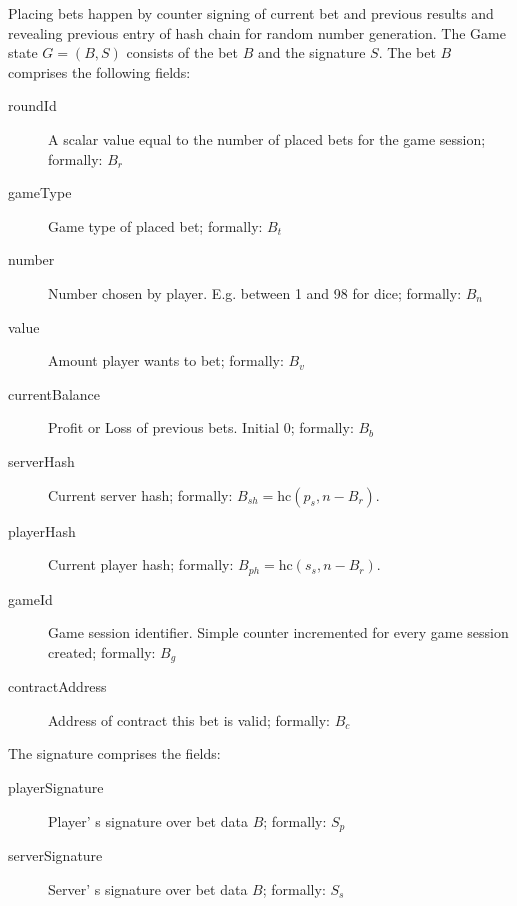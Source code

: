 \documentclass[oneside]{amsart}
\makeatletter
\newcommand*\Eg{E.g.\@\xspace}
\makeatother
\begin{document}
\begin{multicols}{2}
Placing bets happen by counter signing of current bet and previous results and revealing previous entry of
hash chain for random number generation.
The Game state $G = (B, S)$ consists of the bet $B$ and the signature $S$.
The bet $B$ comprises the following fields:
\begin{description}
    \item[roundId] A scalar value equal to the number of placed bets for the game session; formally: $B_r$
    \item[gameType] Game type of placed bet; formally: $B_t$
    \item[number] Number chosen by player. \Eg between 1 and 98 for dice; formally: $B_n$
    \item[value] Amount player wants to bet; formally: $B_v$
    \item[currentBalance] Profit or Loss of previous bets. Initial 0; formally: $B_b$
    \item[serverHash] Current server hash; formally: $B_{sh} = \text{hc}(p_s, n - B_r)$.
    \item[playerHash] Current player hash; formally: $B_{ph} = \text{hc}(s_s, n - B_r)$.
    \item[gameId] Game session identifier. Simple counter incremented for every game session created; formally: $B_{g}$
    \item[contractAddress] Address of contract this bet is valid; formally: $B_{c}$
\end{description}
The signature comprises the fields:
\begin{description}
    \item[playerSignature] Player' s signature over bet data $B$; formally: $S_p$
    \item[serverSignature] Server' s signature over bet data $B$; formally: $S_s$
\end{description}


\end{multicols}
\end{document}
